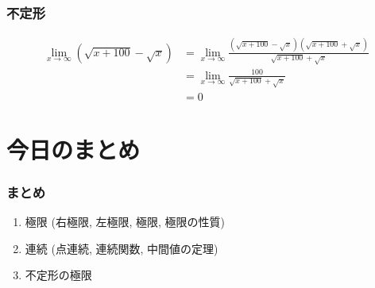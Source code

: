 \documentclass[dvipdfmx,cjk,10.2pt]{beamer}
\theoremstyle{definition}
\begin{document}
\begin{frame}
\frametitle{不定形} 


\begin{align*}
\lim_{x\to \infty} (\sqrt{x+100}-\sqrt{x})
& =  \lim_{x\to \infty} \frac{(\sqrt{x+100}-\sqrt{x})(\sqrt{x+100}+\sqrt{x})}{\sqrt{x+100}+\sqrt{x}} \\
& =  \lim_{x\to \infty} \frac{100}{ \sqrt{x+100}+\sqrt{x}} \\
& =0
\end{align*}


\end{frame}










\section{今日のまとめ}
\begin{frame}
\frametitle{まとめ}   


\begin{enumerate}
\item 極限 (右極限, 左極限, 極限, 極限の性質)
\item 連続 (点連続, 連続関数, 中間値の定理)
\item 不定形の極限
\end{enumerate} 


\end{frame}
\end{document}
